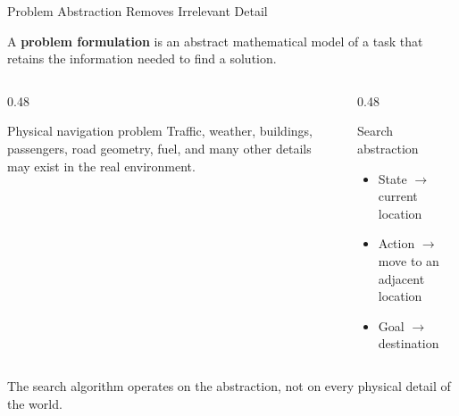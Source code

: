 \documentclass[aspectratio=169,10pt]{beamer}
\begin{document}
\begin{frame}[shrink=20]{Problem Abstraction Removes Irrelevant Detail}
  \begin{cpdefinition}
    A \textbf{problem formulation} is an abstract mathematical model of a task that retains the information needed to find a solution.
  \end{cpdefinition}

  \begin{columns}[T,onlytextwidth]
    \begin{column}{0.48\textwidth}
      \begin{block}{Physical navigation problem}
        Traffic, weather, buildings, passengers, road geometry, fuel, and many other details may exist in the real environment.
      \end{block}
    \end{column}

    \begin{column}{0.48\textwidth}
      \begin{block}{Search abstraction}
        \begin{itemize}
          \item State $\rightarrow$ current location
          \item Action $\rightarrow$ move to an adjacent location
          \item Goal $\rightarrow$ destination
        \end{itemize}
      \end{block}
    \end{column}
  \end{columns}

  \begin{keyidea}
    The search algorithm operates on the abstraction, not on every physical detail of the world.
  \end{keyidea}
\end{frame}
\end{document}
